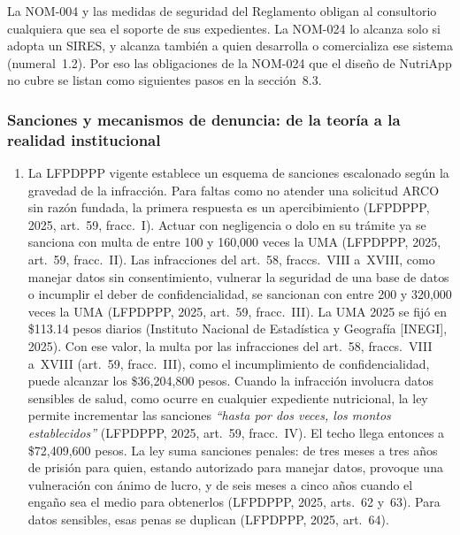\documentclass[12pt, a4paper]{article}
\begin{document}
La NOM-004 y las medidas de seguridad del Reglamento obligan al
consultorio cualquiera que sea el soporte de sus expedientes. La NOM-024
lo alcanza solo si adopta un SIRES, y alcanza también a quien desarrolla
o comercializa ese sistema (numeral~1.2). Por eso las obligaciones de la
NOM-024 que el diseño de NutriApp no cubre se listan como siguientes
pasos en la sección~8.3.
 
\subsubsection{Sanciones y mecanismos de denuncia: de la teoría a la
realidad institucional}
 
\begin{enumerate}[label=\Roman*.]
 
  \item La LFPDPPP vigente establece un esquema de sanciones escalonado
  según la gravedad de la infracción. Para faltas como no atender una
  solicitud ARCO sin razón fundada, la primera respuesta es un
  apercibimiento (LFPDPPP, 2025, art.~59, fracc.~I). Actuar con
  negligencia o dolo en su trámite ya se sanciona con multa de entre 100 y
  160,000 veces la UMA (LFPDPPP, 2025, art.~59, fracc.~II). Las
  infracciones del art.~58, fraccs.~VIII a~XVIII, como manejar datos sin
  consentimiento, vulnerar la seguridad de una base de datos o incumplir
  el deber de confidencialidad, se sancionan con entre 200 y 320,000 veces
  la UMA (LFPDPPP, 2025, art.~59, fracc.~III). La UMA 2025 se fijó en
  \$113.14 pesos diarios (Instituto Nacional de Estadística y Geografía
  [INEGI], 2025). Con ese valor, la multa por las infracciones del
  art.~58, fraccs.~VIII a~XVIII (art.~59, fracc.~III), como el
  incumplimiento de confidencialidad, puede alcanzar los \$36{,}204{,}800
  pesos. Cuando la infracción
  involucra datos sensibles de salud, como ocurre en cualquier
  expediente nutricional, la ley permite incrementar las sanciones
  \textit{``hasta por dos veces, los montos establecidos''} (LFPDPPP,
  2025, art.~59, fracc.~IV).
  El techo llega entonces a \$72{,}409{,}600 pesos. La ley suma
  sanciones penales: de tres meses a tres años de prisión para
  quien, estando autorizado para manejar datos, provoque una
  vulneración con ánimo de lucro, y de seis meses a cinco años
  cuando el engaño sea el medio para obtenerlos (LFPDPPP, 2025,
  arts.~62 y~63). Para datos sensibles, esas penas se duplican
  (LFPDPPP, 2025, art.~64).
 

\end{enumerate}
\end{document}
